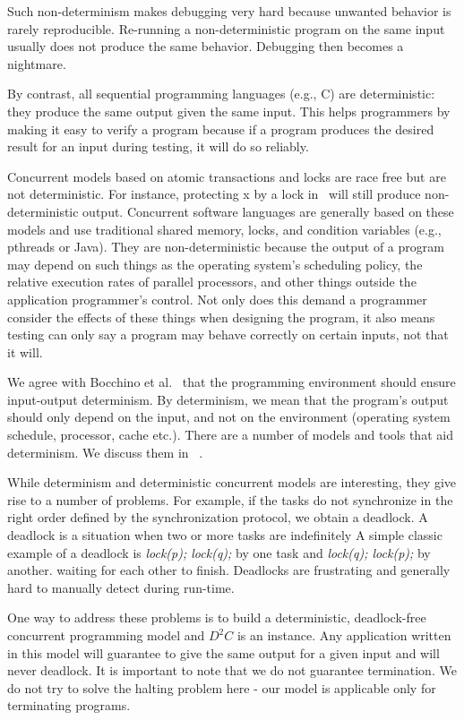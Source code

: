 \documentclass[10pt, conference, compsocconf]{IEEEtran}
\begin{document}
Such non-determinism makes debugging very hard because unwanted behavior is 
rarely reproducible. Re-running a non-deterministic program on the same input usually does not 
produce the same behavior. Debugging then becomes a nightmare. 


By contrast, all sequential programming languages (e.g., C) are deterministic: they produce 
the same output given the same input. This helps programmers by 
making it easy to verify a program because if a program 
produces the desired result for an input during testing, it will do so reliably. 

Concurrent models based on atomic transactions and locks are race free but are not deterministic. 
For instance, protecting x by a lock in~ will still produce non-deterministic output. Concurrent software languages are generally based on these models and use traditional shared memory, 
locks, and condition variables (e.g., pthreads or Java). They are non-deterministic because 
the output of a program may depend on such things as the operating system’s scheduling policy, 
the relative execution rates of parallel processors, and other things outside the application programmer’s control. Not only does this demand a programmer consider the effects of these things 
when designing the program, it also means testing can only say a program may behave correctly 
on certain inputs, not that it will. 

We agree with Bocchino et al.~\cite{bocchino2009parallel}  that the programming environment should ensure input-output 
determinism. By determinism, we mean that the program’s output should only depend on the input, 
and not on the environment (operating system schedule, processor, cache etc.). There are a number
of models and tools that aid determinism. We discuss them in ~.

While determinism and deterministic concurrent models are interesting, they give rise to a number of problems. 
For example, if the tasks do not synchronize in the right order deﬁned by the synchronization 
protocol, we obtain a deadlock.
A deadlock is a situation when two or more tasks are indeﬁnitely 
 A simple classic example of a deadlock is \emph{lock(p); lock(q);}
by one task and \emph{lock(q); lock(p);} by another. 
waiting for each other to ﬁnish. 
Deadlocks are frustrating and generally hard to manually detect 
during run-time. 

One way to address these problems is to build a deterministic, deadlock-free concurrent programming
model and $D^2C$ is an instance. 
Any application written in this model will guarantee to give 
the same output for a given input
and will never deadlock. 
It is important to note that we do not guarantee termination.
We do not try to solve the halting problem here - our model is applicable
only for terminating programs.
\end{document}
